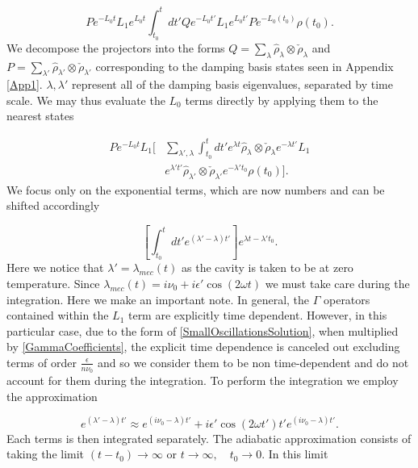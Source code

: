 \documentclass[reprint, amsmath,amssymb, aps,pra]{revtex4-1}
\begin{document}
\begin{equation}
P e^{-L_0 t}L_1e^{L_0 t}\int_{t_0}^{t}dt'Qe^{-L_0 t'}L_1e^{L_0 t'}Pe^{-L_0(t_0)}\rho(t_0).
\end{equation} We decompose the projectors into the forms $Q=\sum_\lambda \hat{\rho}_\lambda \otimes \check{\rho}_\lambda$ and $P=\sum_{\lambda'} \hat{\rho}_{\lambda'} \otimes \check{\rho}_{\lambda'}$ corresponding to the damping basis states seen in Appendix \ref{App1}. $\lambda, \lambda'$ represent all of the damping basis eigenvalues, separated by time scale. We may thus evaluate the $L_0$ terms directly by applying them to the nearest states

\begin{align}\label{ProyectionEQ}
P e^{-L_0 t}L_1[&\sum_{\lambda',\lambda}\int_{t_0}^{t}dt'e^{\lambda t} \hat{\rho}_{\lambda} \otimes \check{\rho}_{\lambda}e^{-\lambda t'}L_1\\
&e^{\lambda' t'}\hat{\rho}_{\lambda'} \otimes \check{\rho}_{\lambda'} e^{-\lambda' t_0}\rho(t_0)]\nonumber.
\end{align} We focus only on the exponential terms, which are now numbers and can be shifted accordingly

\begin{equation}\label{LambdaExponentials}
[\int_{t_0}^t dt' e^{(\lambda'-\lambda)t'}]e^{\lambda t- \lambda't_0}.
\end{equation} Here we notice that $\lambda' = \lambda_{mec}(t)$ as the cavity is taken to be at zero temperature. Since $\lambda_{mec}(t) = i\nu_0 + i\epsilon' \cos(2\omega t)$ we must take care during the integration. Here we make an important note. In general, the $\Gamma$ operators contained within the $L_1$ term are explicitly time dependent. However, in this particular case, due to the form of \eqref{SmallOscillationsSolution}, when multiplied by \eqref{GammaCoefficients}, the explicit time dependence is canceled out excluding terms of order $\frac{\epsilon}{n\nu_0}$ and so we consider them to be non time-dependent and do not account for them during the integration. To perform the integration we employ the approximation

\begin{equation}
e^{(\lambda'-\lambda)t'} \approx e^{(i\nu_0-\lambda)t'} + i\epsilon' \cos(2 \omega t')t' e^{(i\nu_0-\lambda)t'}.
\end{equation} Each terms is then integrated separately. The adiabatic approximation consists of taking the limit $(t-t_0) \to \infty$ or $t \to \infty, \quad t_0 \to 0$. In this limit
\end{document}
